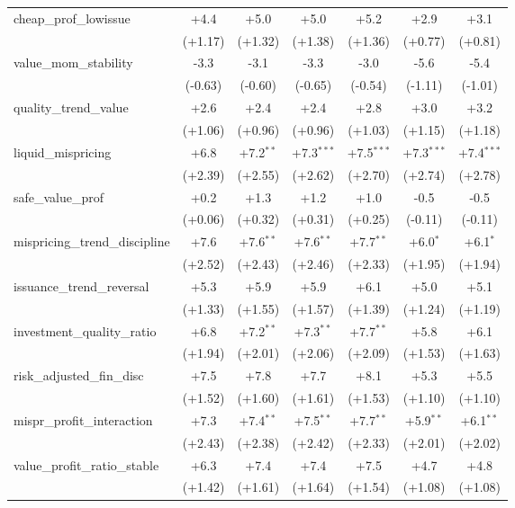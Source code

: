 \begin{table}[htbp]
\begin{threeparttable}
\begin{tabular}{lcccccc}
\addlinespace
cheap\_prof\_lowissue & +4.4 & +5.0 & +5.0 & +5.2 & +2.9 & +3.1 \\
 & (+1.17) & (+1.32) & (+1.38) & (+1.36) & (+0.77) & (+0.81) \\
\addlinespace
value\_mom\_stability & -3.3 & -3.1 & -3.3 & -3.0 & -5.6 & -5.4 \\
 & (-0.63) & (-0.60) & (-0.65) & (-0.54) & (-1.11) & (-1.01) \\
\addlinespace
quality\_trend\_value & +2.6 & +2.4 & +2.4 & +2.8 & +3.0 & +3.2 \\
 & (+1.06) & (+0.96) & (+0.96) & (+1.03) & (+1.15) & (+1.18) \\
\addlinespace
liquid\_mispricing & +6.8 & +7.2$^{**}$ & +7.3$^{***}$ & +7.5$^{***}$ & +7.3$^{***}$ & +7.4$^{***}$ \\
 & (+2.39) & (+2.55) & (+2.62) & (+2.70) & (+2.74) & (+2.78) \\
\addlinespace
safe\_value\_prof & +0.2 & +1.3 & +1.2 & +1.0 & -0.5 & -0.5 \\
 & (+0.06) & (+0.32) & (+0.31) & (+0.25) & (-0.11) & (-0.11) \\
\addlinespace
mispricing\_trend\_discipline & +7.6 & +7.6$^{**}$ & +7.6$^{**}$ & +7.7$^{**}$ & +6.0$^{*}$ & +6.1$^{*}$ \\
 & (+2.52) & (+2.43) & (+2.46) & (+2.33) & (+1.95) & (+1.94) \\
\addlinespace
issuance\_trend\_reversal & +5.3 & +5.9 & +5.9 & +6.1 & +5.0 & +5.1 \\
 & (+1.33) & (+1.55) & (+1.57) & (+1.39) & (+1.24) & (+1.19) \\
\addlinespace
investment\_quality\_ratio & +6.8 & +7.2$^{**}$ & +7.3$^{**}$ & +7.7$^{**}$ & +5.8 & +6.1 \\
 & (+1.94) & (+2.01) & (+2.06) & (+2.09) & (+1.53) & (+1.63) \\
\addlinespace
risk\_adjusted\_fin\_disc & +7.5 & +7.8 & +7.7 & +8.1 & +5.3 & +5.5 \\
 & (+1.52) & (+1.60) & (+1.61) & (+1.53) & (+1.10) & (+1.10) \\
\addlinespace
mispr\_profit\_interaction & +7.3 & +7.4$^{**}$ & +7.5$^{**}$ & +7.7$^{**}$ & +5.9$^{**}$ & +6.1$^{**}$ \\
 & (+2.43) & (+2.38) & (+2.42) & (+2.33) & (+2.01) & (+2.02) \\
\addlinespace
value\_profit\_ratio\_stable & +6.3 & +7.4 & +7.4 & +7.5 & +4.7 & +4.8 \\
 & (+1.42) & (+1.61) & (+1.64) & (+1.54) & (+1.08) & (+1.08) \\

\end{tabular}
\end{threeparttable}
\end{table}
